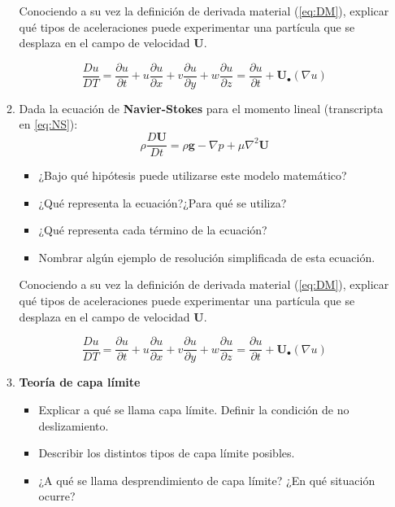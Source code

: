 \begin{itemize}
\begin{enumerate}
      Conociendo a su vez la definición de derivada material (\ref{eq:DM}),
      explicar qué tipos de aceleraciones puede experimentar una partícula
      que se desplaza en el campo de velocidad $\mathbf{U}$.

      \begin{equation}\label{eq:DM}
	\frac{Du}{DT}=\frac{\partial u}{\partial t}+u\frac{\partial u}{\partial x}+v\frac{\partial u}{\partial y}+w\frac{\partial u}{\partial z}=
	\frac{\partial u}{\partial t}+\mathbf{U}_\bullet \left(\nabla u \right)
      \end{equation}

      \item Dada la ecuación de {\bf Navier-Stokes} para el momento lineal (transcripta en \ref{eq:NS}):
      \begin{equation}\label{eq:NS}
      \rho \frac{D\mathbf{U}}{Dt}=	%
      \rho \mathbf{g}		%
      - \nabla p 			%
      + \mu \nabla^2 \mathbf{U}	%
      \end{equation}
      \begin{itemize}
      \item ¿Bajo qué hipótesis puede utilizarse este modelo matemático?
      \item ¿Qué representa la ecuación?¿Para qué se utiliza?
      \item ¿Qué representa cada término de la ecuación?
      \item Nombrar algún ejemplo de resolución simplificada de esta ecuación.
      \end{itemize}

      Conociendo a su vez la definición de derivada material (\ref{eq:DM}),
      explicar qué tipos de aceleraciones puede experimentar una partícula
      que se desplaza en el campo de velocidad $\mathbf{U}$.

      \begin{equation}\label{eq:DM}
	\frac{Du}{DT}=\frac{\partial u}{\partial t}+u\frac{\partial u}{\partial x}+v\frac{\partial u}{\partial y}+w\frac{\partial u}{\partial z}=
	\frac{\partial u}{\partial t}+\mathbf{U}_\bullet \left(\nabla u \right)
      \end{equation}

      
      \item {\bf Teoría de capa límite}
      \begin{itemize}
      \item Explicar a qué se llama capa límite. Definir la condición de no deslizamiento.
      \item Describir los distintos tipos de capa límite posibles.
      \item ¿A qué se llama desprendimiento de capa límite? ¿En qué situación ocurre?
      \end{itemize}


\end{enumerate}
\end{itemize}
